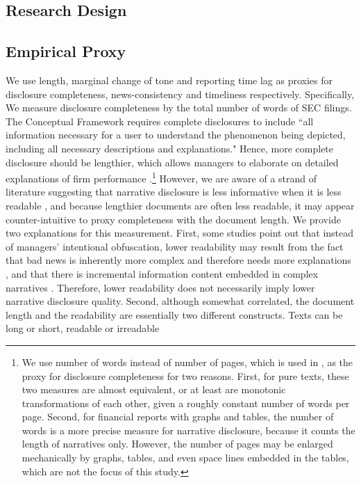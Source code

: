 \documentclass[letterpaper,11pt]{article}
\begin{document}
\begin{spacing}{1.5}
\begin{comment}
Aligned with the prior literature on the usefulness of conservatism, we argue that more complete, news-consistent and timely disclosure of bad news relative to good news enhances contract efficiency [specific hypotheses to be developed]. However, we do not make claims about the valuation role of narrative conservatism.

\end{comment}

\section{Research Design}
\subsection{Empirical Proxy} \label{sec3.1}
We use length, marginal change of tone and reporting time lag as proxies for disclosure completeness, news-consistency and timeliness respectively. Specifically, We measure disclosure completeness by the total number of words of SEC filings. The Conceptual Framework requires complete disclosures to include ``all information necessary for a user to understand the phenomenon being depicted, including all necessary descriptions and explanations."  Hence, more complete disclosure should be lengthier, which allows managers to elaborate on detailed explanations of firm performance \cite{leuzDisclosureCostCapital2009}.\footnote{We use number of words instead of number of pages, which is used in , as the proxy for disclosure completeness for two reasons. First, for pure texts, these two measures are almost equivalent, or at least are monotonic transformations of each other, given a roughly constant number of words per page. Second, for financial reports with graphs and tables, the number of words is a more precise measure for narrative disclosure, because it counts the length of narratives only. However, the number of pages may be enlarged mechanically by graphs, tables, and even space lines embedded in the tables, which are not the focus of this study.} However, we are aware of a strand of literature suggesting that narrative disclosure is less informative when it is less readable , and because lengthier documents are often less readable, it may appear counter-intuitive to proxy completeness with the document length. We provide two explanations for this measurement. First, some studies point out that instead of managers' intentional obfuscation, lower readability may result from the fact that bad news is inherently more complex and therefore needs more explanations , and that there is incremental information content embedded in complex narratives . Therefore, lower readability does not necessarily imply lower narrative disclosure quality. Second, although somewhat correlated, the document length and the readability are essentially two different constructs. Texts can be long or short, readable or irreadable 
\end{spacing}
\end{document}
